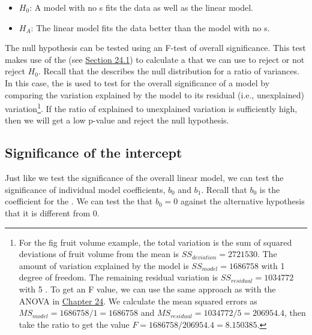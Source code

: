 \documentclass[
  openany]{krantz}
\providecommand{\tightlist}{%
  \setlength{\itemsep}{0pt}\setlength{\parskip}{0pt}}
\begin{document}
\begin{itemize}
\tightlist
\item
  \(H_{0}\): A model with no s fits the data as well as the linear model.
\item
  \(H_{A}\): The linear model fits the data better than the model with no s.
\end{itemize}

The null hypothesis can be tested using an F-test of overall significance.
This test makes use of the  (see \protect\hyperlink{the-f-distribution}{Section 24.1}) to calculate a  that we can use to reject or not reject \(H_{0}\).
Recall that the  describes the null distribution for a ratio of variances.
In this case, the  is used to test for the overall significance of a  model by comparing the variation explained by the model to its residual (i.e., unexplained) variation\footnote{For the fig fruit volume example, the total variation is the sum of squared deviations of fruit volume from the mean is \(SS_{deviation} = 2721530\). The amount of variation explained by the model is \(SS_{model} = 1686758\) with 1 degree of freedom. The remaining residual variation is \(SS_{residual} = 1034772\) with 5 . To get an F value, we can use the same approach as with the ANOVA in \protect\hyperlink{Chapter_24}{Chapter 24}. We calculate the mean squared errors as \(MS_{model} = 1686758/1 = 1686758\) and \(MS_{residual} = 1034772/5 = 206954.4\), then take the ratio to get the value \(F = 1686758 / 206954.4 = 8.150385\).}.
If the ratio of explained to unexplained variation is sufficiently high, then we will get a low p-value and reject the null hypothesis.

\hypertarget{significance-of-the-intercept}{%
\subsection{Significance of the intercept}\label{significance-of-the-intercept}}

Just like we test the significance of the overall linear model, we can test the significance of individual model coefficients, \(b_{0}\) and \(b_{1}\).
Recall that \(b_{0}\) is the coefficient for the .
We can test the  that \(b_{0} = 0\) against the alternative hypothesis that it is different from 0.
\end{document}
